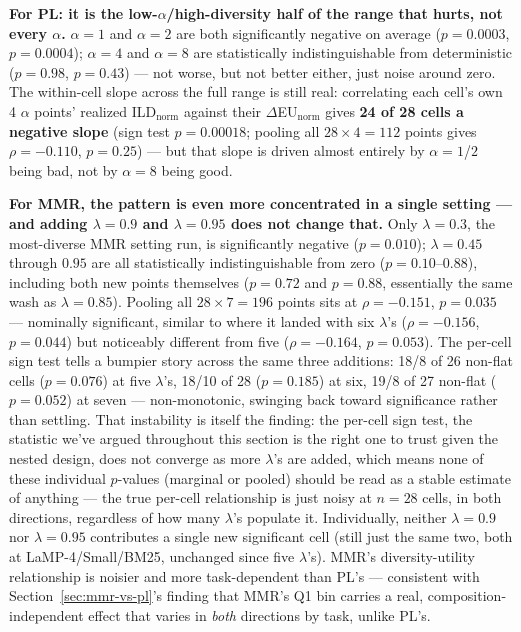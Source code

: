 \documentclass[10pt]{article}
\begin{document}
\textbf{For PL: it is the low-$\alpha$/high-diversity half of the range that hurts,
not every $\alpha$.} $\alpha{=}1$ and $\alpha{=}2$ are both significantly negative
on average ($p{=}0.0003$, $p{=}0.0004$); $\alpha{=}4$ and $\alpha{=}8$ are
statistically indistinguishable from deterministic ($p{=}0.98$, $p{=}0.43$) ---
not worse, but not better either, just noise around zero. The within-cell slope
across the full range is still real: correlating each cell's own 4 $\alpha$ points'
realized ILD$_{\text{norm}}$ against their $\Delta$EU$_{\text{norm}}$ gives
\textbf{24 of 28 cells a negative slope} (sign test $p{=}0.00018$; pooling all
$28{\times}4{=}112$ points gives $\rho{=}-0.110$, $p{=}0.25$) --- but that slope is
driven almost entirely by $\alpha{=}1$/$2$ being bad, not by $\alpha{=}8$ being
good.

\textbf{For MMR, the pattern is even more concentrated in a single setting ---
and adding $\lambda{=}0.9$ and $\lambda{=}0.95$ does not change that.} Only
$\lambda{=}0.3$, the most-diverse MMR setting run, is significantly negative
($p{=}0.010$); $\lambda{=}0.45$ through $0.95$ are all statistically
indistinguishable from zero ($p{=}0.10$--$0.88$), including both new points
themselves ($p{=}0.72$ and $p{=}0.88$, essentially the same wash as
$\lambda{=}0.85$). Pooling all $28{\times}7{=}196$ points sits at
$\rho{=}-0.151$, $p{=}0.035$ --- nominally significant, similar to where it
landed with six $\lambda$'s ($\rho{=}-0.156$, $p{=}0.044$) but noticeably
different from five ($\rho{=}-0.164$, $p{=}0.053$). The per-cell sign test tells
a bumpier story across the same three additions: 18/8 of 26 non-flat cells
($p{=}0.076$) at five $\lambda$'s, 18/10 of 28 ($p{=}0.185$) at six, 19/8 of 27
non-flat ($p{=}0.052$) at seven --- non-monotonic, swinging back toward
significance rather than settling. That instability is itself the finding: the
per-cell sign test, the statistic we've argued throughout this section is the
right one to trust given the nested design, does not converge as more $\lambda$'s
are added, which means none of these individual $p$-values (marginal or pooled)
should be read as a stable estimate of anything --- the true per-cell relationship
is just noisy at $n{=}28$ cells, in both directions, regardless of how many
$\lambda$'s populate it. Individually, neither $\lambda{=}0.9$ nor $\lambda{=}0.95$
contributes a single new significant cell (still just the same two, both at
LaMP-4/Small/BM25, unchanged since five $\lambda$'s). MMR's diversity-utility
relationship is noisier and more task-dependent than PL's --- consistent with
Section~\ref{sec:mmr-vs-pl}'s finding that MMR's Q1 bin carries a real,
composition-independent effect that varies in \emph{both} directions by task,
unlike PL's.
\end{document}
